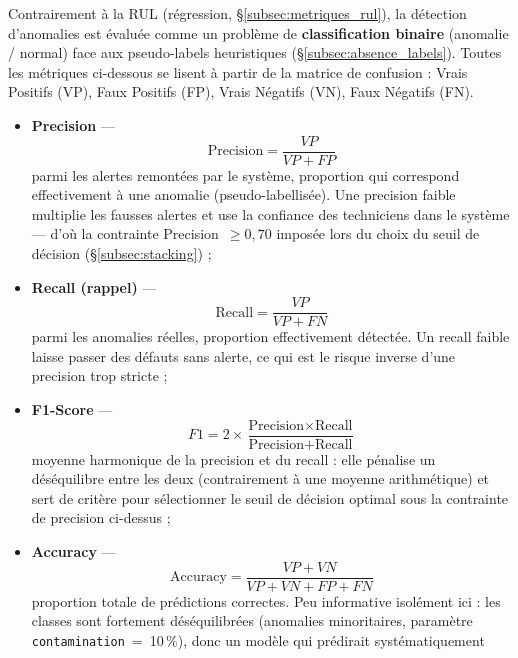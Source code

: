 \documentclass[12pt,a4paper]{report}
\begin{document}
Contrairement à la RUL (régression, \S\ref{subsec:metriques_rul}), la détection d'anomalies est évaluée comme
un problème de \textbf{classification binaire} (anomalie / normal) face aux pseudo-labels
heuristiques (\S\ref{subsec:absence_labels}). Toutes les métriques ci-dessous se lisent à
partir de la matrice de confusion : Vrais Positifs (VP), Faux Positifs (FP), Vrais
Négatifs (VN), Faux Négatifs (FN).



\begin{itemize}
  \item \textbf{Precision} —
    \begin{equation}
      \text{Precision} = \frac{VP}{VP + FP}
    \end{equation}
    parmi les alertes remontées par le système, proportion qui correspond effectivement à
    une anomalie (pseudo-labellisée). Une precision faible multiplie les fausses alertes
    et use la confiance des techniciens dans le système — d'où la contrainte
    Precision~$\geq 0{,}70$ imposée lors du choix du seuil de décision
    (\S\ref{subsec:stacking}) ;
  \item \textbf{Recall (rappel)} —
    \begin{equation}
      \text{Recall} = \frac{VP}{VP + FN}
    \end{equation}
    parmi les anomalies réelles, proportion effectivement détectée. Un recall faible
    laisse passer des défauts sans alerte, ce qui est le risque inverse d'une precision
    trop stricte ;
  \item \textbf{F1-Score} —
    \begin{equation}
      F1 = 2 \times \frac{\text{Precision} \times \text{Recall}}{\text{Precision} + \text{Recall}}
    \end{equation}
    moyenne harmonique de la precision et du recall : elle pénalise un déséquilibre entre
    les deux (contrairement à une moyenne arithmétique) et sert de critère pour
    sélectionner le seuil de décision optimal sous la contrainte de precision ci-dessus ;
  \item \textbf{Accuracy} —
    \begin{equation}
      \text{Accuracy} = \frac{VP + VN}{VP + VN + FP + FN}
    \end{equation}
    proportion totale de prédictions correctes. Peu informative isolément ici : les
    classes sont fortement déséquilibrées (anomalies minoritaires, paramètre
    \texttt{contamination}~=~10\,\%), donc un modèle qui prédirait systématiquement

\end{itemize}
\end{document}
